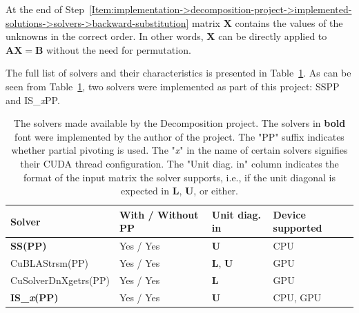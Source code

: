 At the end of Step~\ref{Item:implementation->decomposition-project->implemented-solutions->solvers->backward-substitution} matrix $\mathbf{X}$ contains the values of the unknowns in the correct order.
In other words, $\mathbf{X}$ can be directly applied to $\mathbf{AX} = \mathbf{B}$ without the need for permutation.

The full list of solvers and their characteristics is presented in Table~\ref{Table:implementation->decomposition-project->implemented-solutions->solvers->solvers-in-the-project}.
As can be seen from Table~\ref{Table:implementation->decomposition-project->implemented-solutions->solvers->solvers-in-the-project}, two solvers were implemented as part of this project: SSPP and IS\_\textit{x}PP.

\begin{table}[!ht]
	\centering
	\begin{tabular}{|l|l|l|l|}
		\hline
		\rowcolor[HTML]{C0C0C0}\textbf{Solver}              & \textbf{With / Without PP} & \textbf{Unit diag. in}     & \textbf{Device supported} \\ \hline
		\cellcolor[HTML]{EFEFEF}\textbf{SS(PP)}             & Yes / Yes                  & $\mathbf{U}$               & CPU                       \\
		\cellcolor[HTML]{EFEFEF}CuBLAStrsm(PP)              & Yes / Yes                  & $\mathbf{L}$, $\mathbf{U}$ & GPU                       \\
		\cellcolor[HTML]{EFEFEF}CuSolverDnXgetrs(PP)        & Yes / Yes                  & $\mathbf{L}$               & GPU                       \\
		\cellcolor[HTML]{EFEFEF}\textbf{IS\_\textit{x}(PP)} & Yes / Yes                  & $\mathbf{U}$               & CPU, GPU                  \\ \hline
	\end{tabular}
	\caption{The solvers made available by the Decomposition project.
		The solvers in \textbf{bold} font were implemented by the author of the project.
		The "PP" suffix indicates whether partial pivoting is used.
		The "\textit{x}" in the name of certain solvers signifies their CUDA thread configuration.
		The "Unit diag. in" column indicates the format of the input matrix the solver supports, i.e., if the unit diagonal is expected in $\mathbf{L}$, $\mathbf{U}$, or either.
	}
	\label{Table:implementation->decomposition-project->implemented-solutions->solvers->solvers-in-the-project}
\end{table}

